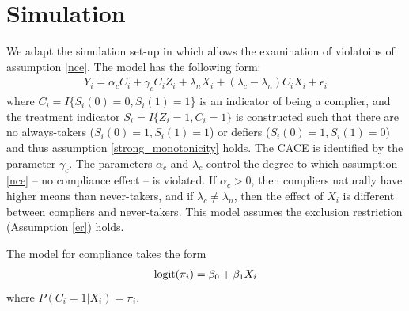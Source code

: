 \documentclass{article}
\begin{document}




\section{Simulation}
We adapt the simulation set-up in \citep{stuart2015assessing} which allows the examination of violatoins of assumption \ref{nce}. The model has the following form:
\begin{align}
Y_i = \alpha_c C_i + \gamma_cC_iZ_i + \lambda_n X_i + (\lambda_c - \lambda_n)C_iX_i + \epsilon_i
\end{align}
where $C_i = I\{S_i(0) = 0, S_i(1) = 1\}$ is an indicator of being a complier, and the treatment indicator $S_i = I\{Z_i = 1, C_i = 1\}$ is constructed such that there are no always-takers ($S_i(0) = 1, S_i(1) = 1$) or defiers ($S_i(0) = 1, S_i(1) = 0$) and thus assumption \ref{strong_monotonicity} holds. The CACE is identified by the parameter $\gamma_c$. The parameters $\alpha_c$ and $\lambda_c$ control the degree to which assumption \ref{nce} -- no compliance effect -- is violated. If $\alpha_c > 0$, then compliers naturally have higher means than never-takers, and if $\lambda_c \neq \lambda_n$, then the effect of $X_i$ is different between compliers and never-takers. This model assumes the exclusion restriction (Assumption \ref{er}) holds.

The model for compliance takes the form
\begin{align}
\mbox{logit}(\pi_i) = \beta_0 + \beta_1X_i
\end{align}
where $P(C_i = 1 | X_i) = \pi_i$.
\end{document}
